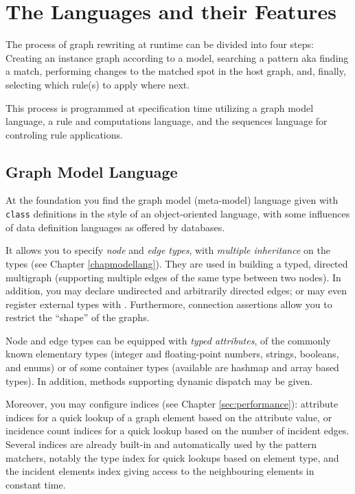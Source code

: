 \section{The Languages and their Features}

The process of graph rewriting at runtime can be divided into four steps:
Creating an instance graph according to a model,
searching a pattern aka finding a match,
performing changes to the matched spot in the host graph,
and, finally, selecting which rule(s) to apply where next.

This process is programmed at specification time utilizing a graph model language, a rule and computations language, and the sequences language for controling rule applications.

\subsection{Graph Model Language}
At the foundation you find the graph model (meta-model) language given with \texttt{class} definitions in the style of an object-oriented language, with some influences of data definition languages as offered by databases. 

It allows you to specify \emph{node} and \emph{edge types}, with \emph{multiple inheritance} on the types (see Chapter \ref{chapmodellang}).
They are used in building a typed, directed multigraph (supporting multiple edges of the same type between two nodes).
In addition, you may declare undirected and arbitrarily directed edges; or may even register external types with \GrG.
Furthermore, connection assertions allow you to restrict the ``shape'' of the graphs.

Node and edge types can be equipped with \emph{typed attributes}, of the commonly known elementary types (integer and floating-point numbers, strings, booleans, and enums) or of some container types (available are hashmap and array based types).
In addition, methods supporting dynamic dispatch may be given.%

Moreover, you may configure indices (see Chapter \ref{sec:performance}): attribute indices for a quick lookup of a graph element based on the attribute value, or incidence count indices for a quick lookup based on the number of incident edges.
Several indices are already built-in and automatically used by the pattern matchers, notably the type index for quick lookups based on element type, and the incident elements index giving access to the neighbouring elements in constant time.

